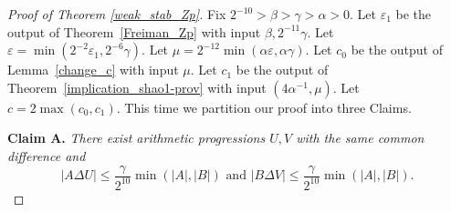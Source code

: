 \documentclass[12pt,reqno]{amsart}
\theoremstyle{definition}
\renewcommand\leq{\leqslant}
\begin{document}
\begin{proof}[Proof of Theorem \ref{weak_stab_Zp}]
Fix $2^{-10}>\beta>\gamma>\alpha>0$. Let $\varepsilon_1$ be the output of Theorem~\ref{Freiman_Zp} with input $\beta,2^{-11}\gamma$. Let $\varepsilon=\min(2^{-2}\varepsilon_1,2^{-6}\gamma)$. Let $\mu=2^{-12}\min(\alpha \varepsilon, \alpha \gamma)$. Let $c_0$ be the output of Lemma~\ref{change_c} with input $\mu$. Let $c_1$ be the output of Theorem~\ref{implication_shao1-prov} with input $(4\alpha^{-1},\mu)$. Let $c=2\max(c_0,c_1)$. This time we partition our proof into three Claims.

\vspace{5pt}
{\bf Claim A. }{\em
There exist arithmetic progressions $U,V$ with the same common difference and
\begin{equation}\label{eq22.05}
    |A\Delta U| \leq \frac{\gamma}{2^{10}} \min(|A|,|B|) \text{ and } |B\Delta V| \leq \frac{\gamma}{2^{10}} \min(|A|,|B|).
\end{equation}
}


\end{proof}
\end{document}
